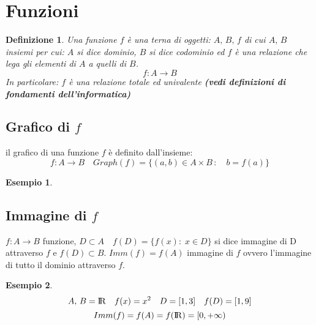 \documentclass[12pt, a4paper]{article}
\theoremstyle{break}
\newtheorem{definition}{Definizione}[subsection]
\newtheorem{example}{Esempio}[subsection]
\newcommand\R{{\rm I\!R}}
\begin{document}
    \section{Funzioni}
    \begin{definition}
        Una funzione $f$ è una terna di oggetti: $A,\,B,\,f$ di cui $A,\,B$ insiemi per cui:\newline
        $A$ si dice dominio, $B$ si dice codominio ed $f$ è una relazione che lega gli elementi di $A$ a quelli di $B$.
        \[f:A\rightarrow B\]
        In particolare: $f$ è una relazione totale ed univalente \scriptsize \textbf{(vedi definizioni di fondamenti dell'informatica)}
        \normalsize
    \end{definition}
    \subsection{Grafico di $f$}
    il grafico di una funzione $f$ è definito dall'insieme:
    \[f: A\rightarrow B\quad Graph(f) = \{(a,b)\in A\times B\,:\quad b = f(a)\}\]
    \begin{example}
        \begin{figure}[!htb]
            \centering
        \end{figure}
    \end{example}
    \subsection{Immagine di $f$}
    $f: A\rightarrow B$ funzione, $D\subset A \quad f(D) = \{f(x) :\; x\in D\}$ si dice immagine di D attraverso $f$ e
    $f(D)\subset B$. \newline $Imm(f) = f(A)$ immagine di $f$ ovvero l'immagine di tutto il dominio attraverso $f$.
    \newline
    \begin{example}
        \[A,\,B = \R\quad f(x) = x^2\quad D = [1,3]\quad f(D) = [1,9]\]
        \[Imm(f) = f(A) = f(\R) = [0, +\infty)\]
    \end{example}
    \newpage
\end{document}

